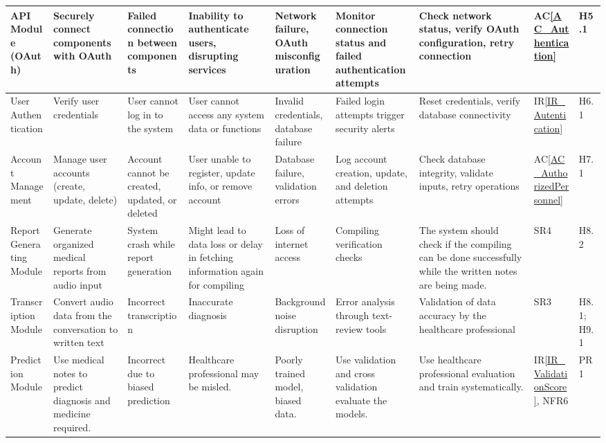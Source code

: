\documentclass{article}
\begin{document}
\begin{landscape}
\begin{longtable}{|p{1.5cm}|p{2cm}|p{2.6cm}|p{2cm}|p{2cm}|p{2cm}|p{3.5cm}|p{1cm}|p{0.8cm}|}
        \midrule
        API Module (OAuth) & \raggedright Securely connect components with OAuth & \raggedright Failed connection between components & \raggedright Inability to authenticate users, disrupting services & \raggedright Network failure, OAuth misconfiguration & \raggedright Monitor connection status and failed authentication attempts & \raggedright Check network status, verify OAuth configuration, retry connection & AC\ref{AC_Authentication} & H5.1 \\
        \midrule
        User Authentication & \raggedright Verify user credentials & \raggedright User cannot log in to the system & \raggedright User cannot access any system data or functions & \raggedright Invalid credentials, database failure & \raggedright Failed login attempts trigger security alerts & \raggedright Reset credentials, verify database connectivity & IR\ref{IR_Autentication} & H6.1 \\
        \midrule
        Account Management & \raggedright Manage user accounts (create, update, delete) & \raggedright Account cannot be created, updated, or deleted & \raggedright User unable to register, update info, or remove account & \raggedright Database failure, validation errors & \raggedright Log account creation, update, and deletion attempts & \raggedright Check database integrity, validate inputs, retry operations & AC\ref{AC_AuthorizedPersonnel} & H7.1 \\ 
        \midrule
        Report Generating Module & \raggedright Generate organized medical reports from audio input & \raggedright System crash while report generation & \raggedright Might lead to data loss or delay in fetching information again for compiling & \raggedright Loss of internet access & \raggedright Compiling verification checks & \raggedright The system should check if the compiling can be done successfully while the written notes are being made. & SR4 & H8.2 \\
        \midrule
        Transcription Module & \raggedright Convert audio data from the conversation to written text & \raggedright Incorrect transcription & \raggedright Inaccurate diagnosis & \raggedright Background noise disruption & \raggedright Error analysis through text-review tools & \raggedright Validation of data accuracy by the healthcare professional & SR3 & H8.1; H9.1 \\ 
        \midrule
        Prediction Module & \raggedright Use medical notes to predict diagnosis and medicine required. & \raggedright Incorrect due to biased prediction & \raggedright Healthcare professional may be misled. & \raggedright Poorly trained model, biased data. & \raggedright Use validation and cross validation evaluate the models. & \raggedright Use healthcare professional evaluation and train systematically. & IR\ref{IR_ValidationScore}, NFR6 & PR1 \\

\end{longtable}
\end{landscape}
\end{document}
